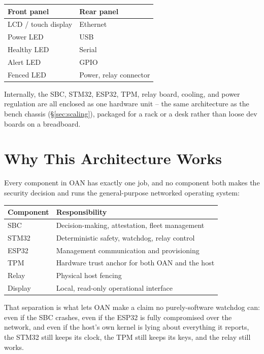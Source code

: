 \documentclass[11pt,a4paper]{article}
\begin{document}
\begin{center}
\renewcommand{\arraystretch}{1.3}
\begin{tabular}{@{}p{6.5cm}p{6.5cm}@{}}
\toprule
\textbf{Front panel} & \textbf{Rear panel} \\
\midrule
LCD / touch display & Ethernet \\
Power LED & USB \\
Healthy LED & Serial \\
Alert LED & GPIO \\
Fenced LED & Power, relay connector \\
\bottomrule
\end{tabular}
\end{center}

Internally, the SBC, STM32, ESP32, TPM, relay board, cooling, and power
regulation are all enclosed as one hardware unit -- the same
architecture as the bench chassis (\S\ref{sec:scaling}), packaged for a
rack or a desk rather than loose dev boards on a breadboard.

\section{Why This Architecture Works}

Every component in OAN has exactly one job, and no component both makes
the security decision and runs the general-purpose networked operating
system:

\begin{center}
\renewcommand{\arraystretch}{1.35}
\begin{tabular}{@{}lp{9.6cm}@{}}
\toprule
\textbf{Component} & \textbf{Responsibility} \\
\midrule
SBC & Decision-making, attestation, fleet management \\
STM32 & Deterministic safety, watchdog, relay control \\
ESP32 & Management communication and provisioning \\
TPM & Hardware trust anchor for both OAN and the host \\
Relay & Physical host fencing \\
Display & Local, read-only operational interface \\
\bottomrule
\end{tabular}
\end{center}

That separation is what lets OAN make a claim no purely-software
watchdog can: even if the SBC crashes, even if the ESP32 is fully
compromised over the network, and even if the host's own kernel is
lying about everything it reports, the STM32 still keeps its clock, the
TPM still keeps its keys, and the relay still works.
\end{document}
